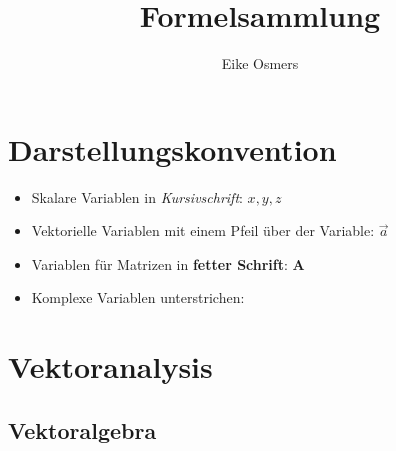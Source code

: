 \documentclass[a4paper]{article}
\begin{document}
\title{\textbf{{\Huge Formelsammlung}}}
\author{Eike Osmers}
\maketitle
\thispagestyle{empty}
\newpage

\thispagestyle{empty}
\setcounter{page}{0}
\tableofcontents
\newpage
\setcounter{page}{1}

\section{Darstellungskonvention}

\begin{itemize}
\item[] Skalare Variablen in \textit{Kursivschrift}: $x, y, z$
\item[] Vektorielle Variablen mit einem Pfeil über der Variable: $\vec{a}$
\item[] Variablen für Matrizen in \textbf{fetter Schrift}: $\mathbf{A}$
\item[] Komplexe Variablen unterstrichen: 
\end{itemize}

\newpage
\section{Vektoranalysis}

\subsection{Vektoralgebra}
\end{document}
